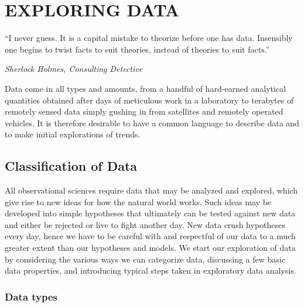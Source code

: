 %
\chapter{EXPLORING DATA}
\label{ch:EDA}
\epigraph{``I never guess. It is a capital mistake to theorize before one has data. Insensibly one begins to twist facts to suit theories, instead of theories to suit facts.''}{\textit{Sherlock Holmes, Consulting Detective}}
Data come in all types and amounts, from a handful of hard-earned analytical quantities obtained after days of meticulous
work in a laboratory to terabytes of remotely sensed data simply gushing in from satellites and remotely operated vehicles.
It is therefore desirable to have a common language to describe data and to make initial explorations of trends.

\section{Classification of Data}
All observational sciences require data that may be analyzed and explored, which give rise to new ideas for
how the natural world works.  Such ideas may be developed into simple hypotheses that ultimately can be tested
against new data and either be rejected or live to fight another day.  New data crush hypotheses every day,
hence we have to be careful with and respectful of our data to a much greater extent than our hypotheses and models.
We start our exploration of data by considering the various ways we can categorize data,
discussing a few basic data properties, and introducing typical steps taken in exploratory data analysis.

\subsection{Data types}

